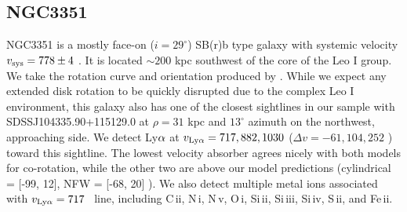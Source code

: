 \subsection{NGC3351}
NGC3351 is a mostly face-on ($i = 29^{\circ}$) SB(r)b type galaxy with systemic velocity  $v_{\rm sys} = 778 \pm 4$ \kms. It is located $\sim200$ kpc southwest of the core of the Leo I group. We take the rotation curve and orientation produced by \cite{dicaire2008}. While we expect any extended disk rotation to be quickly disrupted due to the complex Leo I environment, this galaxy also has one of the closest sightlines in our sample with SDSSJ104335.90+115129.0 at $\rho = 31$ kpc and $13^{\circ}$ azimuth on the northwest, approaching side. We detect Ly$\rm \alpha$ at $v_{\rm Ly\alpha} = 717, 882, 1030$ \kms ($\Delta v = -61, 104, 252$ \kms) toward this sightline. The lowest velocity absorber agrees nicely with both models for co-rotation, while the other two are above our model predictions (cylindrical = [-99, 12], NFW = [-68, 20] \kms). We also detect multiple metal ions associated with $v_{\rm Ly\alpha} = 717$ \kms~line, including C\,{\sc ii}, N\,{\sc i}, N\,{\sc v}, O\,{\sc i}, Si\,{\sc ii}, Si\,{\sc iii}, Si\,{\sc iv}, S\,{\sc ii}, and Fe\,{\sc ii}.








